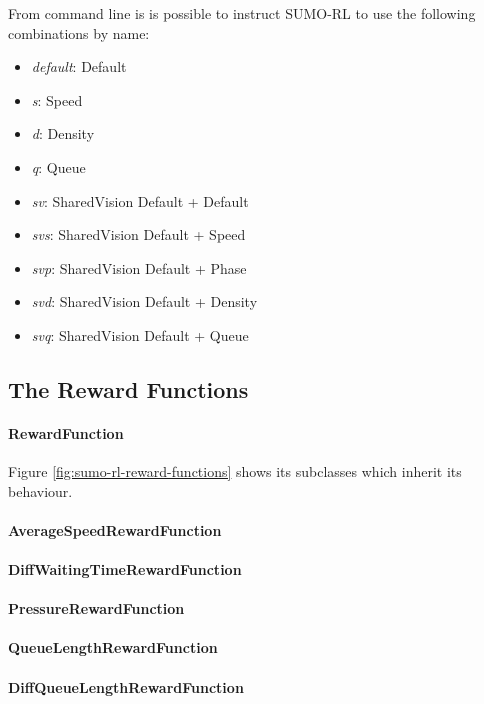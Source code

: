 From command line is is possible to instruct SUMO-RL to use the following combinations by name:

\begin{itemize}
  \item \textit{default}: Default
  \item \textit{s}: Speed
  \item \textit{d}: Density
  \item \textit{q}: Queue
  \item \textit{sv}: SharedVision { Default + Default }
  \item \textit{svs}: SharedVision { Default + Speed }
  \item \textit{svp}: SharedVision { Default + Phase }
  \item \textit{svd}: SharedVision { Default + Density }
  \item \textit{svq}: SharedVision { Default + Queue }
\end{itemize}

\subsection{The Reward Functions}

\paragraph{RewardFunction}

Figure \ref{fig:sumo-rl-reward-functions} shows its subclasses which inherit its behaviour.


\paragraph{AverageSpeedRewardFunction}
\paragraph{DiffWaitingTimeRewardFunction}
\paragraph{PressureRewardFunction}
\paragraph{QueueLengthRewardFunction}
\paragraph{DiffQueueLengthRewardFunction}
